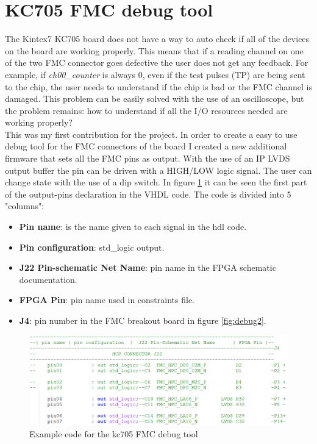 \section{KC705 FMC debug tool}
\noindent The Kintex7 KC705 board does not have a way to auto check if all of the devices on the board are working properly. This means that if a reading channel on one of the two FMC connector goes defective the user does not get any feedback.
For example, if \textit{ch00\_counter} is always 0, even if the test pulses (TP) are being sent to the chip, the user needs to understand if the chip is bad or the FMC channel is damaged. This problem can be easily solved with the use of an oscilloscope, but the problem remains:
how to understand if all the I/O resources needed are working properly?
\\
This was my first contribution for the project.
In order to create a easy to use debug tool for the FMC connectors of the board I created a new additional firmware that sets all the FMC pins as output.
With the use of an IP LVDS output buffer the pin can be driven with a HIGH/LOW logic signal. The user can change state with the use of a dip switch.
In figure \ref{fig:debug1} it can be seen the first part of the output-pins declaration in the VHDL code. The code is divided into 5 "columns":
\begin{itemize}
	\item \textbf{Pin name}: is the name given to each signal in the hdl code.
	\item \textbf{Pin configuration}: std\_logic output.
	\item \textbf{J22 Pin-schematic Net Name}: pin name in the FPGA schematic documentation. 
	\item \textbf{FPGA Pin}: pin name used in constraints file. 
	\item \textbf{J4}: pin number in the FMC breakout board in figure \ref{fig:debug2}. 
\end{itemize}     
\begin{figure}[H]
	\centering
	\includegraphics[width=0.7\linewidth]{IMG/ch3/DEBUG1}
	\caption{Example code for the kc705 FMC debug tool}
	\label{fig:debug1}
\end{figure}
